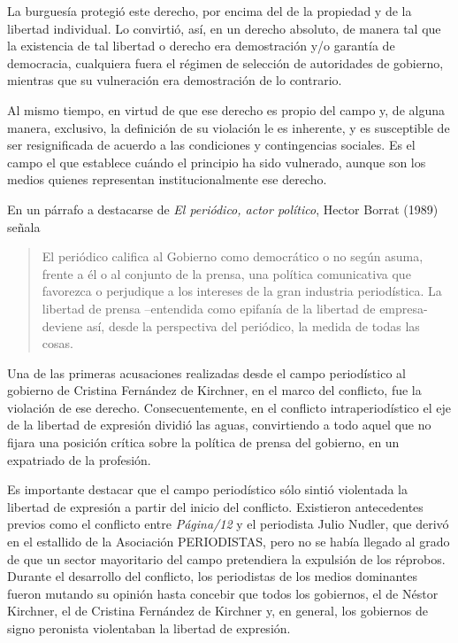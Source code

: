 {La burguesía protegió este derecho, por encima del de la propiedad y de la libertad individual. Lo convirtió, así, en un derecho absoluto, de manera tal que la existencia de tal libertad o derecho era demostración y/o garantía de democracia, cualquiera fuera el régimen de selección de autoridades de gobierno, mientras que su vulneración era demostración de lo contrario.

Al mismo tiempo, en virtud de que ese derecho es propio del campo y, de alguna manera, exclusivo, la definición de su violación le es inherente, y es susceptible de ser resignificada de acuerdo a las condiciones y contingencias sociales. Es el campo el que establece cuándo el principio ha sido vulnerado, aunque son los medios quienes representan institucionalmente ese derecho.

En un párrafo a destacarse de \emph{El periódico, actor político}, Hector Borrat (1989) señala

\begin{quote}
El periódico califica al Gobierno como democrático o no según asuma, frente a él o al conjunto de la prensa, una política comunicativa que favorezca o perjudique a los intereses de la gran industria periodística. La libertad de prensa --entendida como epifanía de la libertad de empresa- deviene así, desde la perspectiva del periódico, la medida de todas las cosas.
\end{quote}

Una de las primeras acusaciones realizadas desde el campo periodístico al gobierno de Cristina Fernández de Kirchner, en el marco del conflicto, fue la violación de ese derecho. Consecuentemente, en el conflicto intraperiodístico el eje de la libertad de expresión dividió las aguas, convirtiendo a todo aquel que no fijara una posición crítica sobre la política de prensa del gobierno, en un expatriado de la profesión.

Es importante destacar que el campo periodístico sólo sintió violentada la libertad de expresión a partir del inicio del conflicto. Existieron antecedentes previos como el conflicto entre \emph{Página/12} y el periodista Julio Nudler, que derivó en el estallido de la Asociación PERIODISTAS, pero no se había llegado al grado de que un sector mayoritario del campo pretendiera la expulsión de los réprobos. Durante el desarrollo del conflicto, los periodistas de los medios dominantes fueron mutando su opinión hasta concebir que todos los gobiernos, el de Néstor Kirchner, el de Cristina Fernández de Kirchner y, en general, los gobiernos de signo peronista violentaban la libertad de expresión.

}
